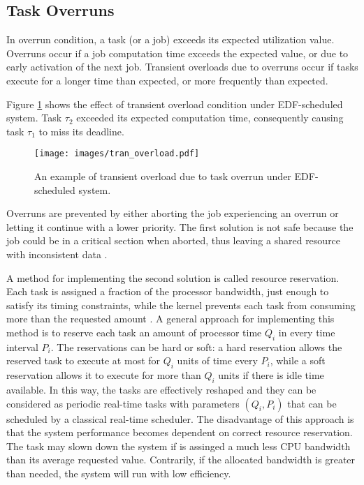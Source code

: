 \subsection{Task Overruns}
In overrun condition, a task (or a job) exceeds its expected utilization value.
Overruns occur if a job computation time exceeds the expected value, or due to early activation of the next job.
Transient overloads due to overruns occur if tasks execute for a longer time than expected, or more frequently than expected.

Figure \ref{transient_EDF} shows the effect of transient overload condition under EDF-scheduled system. Task $\tau_2$ exceeded its expected computation time, consequently causing task $\tau_1$ to miss its deadline.
\begin{figure}[ht]
    \centering
    \texttt{[image: images/tran\_overload.pdf]}
    \caption{An example of transient overload due to task overrun under EDF-scheduled system.}
    \label{transient_EDF}
\end{figure}

Overruns are prevented by either aborting the job experiencing an overrun or letting it continue with a lower priority. 
The first solution is not safe because the job could be in a critical section when aborted, thus leaving a shared resource with inconsistent data 
\cite{buttazzo2011hard}. 

A method for implementing the second solution is called resource reservation.
Each task is assigned a fraction of the processor bandwidth, just enough to satisfy its timing constraints, while the kernel prevents each task from consuming more than the requested amount \cite{buttazzo2011hard}. 
A general approach for implementing this method is to reserve each task an amount of processor time $Q_i$ in every time interval $P_i$. 
The reservations can be hard or soft: a hard reservation allows the reserved task to execute at most for $Q_i$ units of time every $P_i$, while a soft reservation allows it to execute for more than $Q_i$ units if there is idle time available. 
In this way, the tasks are effectively reshaped and they can be considered as 
periodic real-time tasks with parameters \( (Q_i, P_i) \) that can be scheduled by a classical real-time scheduler.
The disadvantage of this approach is that the system performance becomes dependent on correct resource reservation. The task may slown down the system if is assinged a much less CPU bandwidth than its average requested value. Contrarily, if the allocated bandwidth is greater than needed, the system will run with low efficiency.

